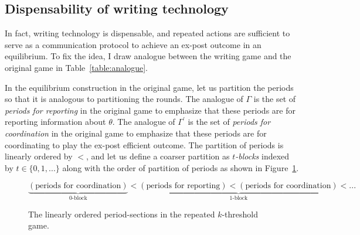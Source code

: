 \documentclass[12pt,letter]{article}
\theoremstyle{definition}
\theoremstyle{remark}
\theoremstyle{claim}
\begin{document}
\subsection{Dispensability of writing technology}
\label{sec:dis_writing}
In fact, writing technology is dispensable, and repeated actions are sufficient to serve as a communication protocol to achieve an ex-post outcome in an equilibrium. To fix the idea, I draw analogue between the writing game and the original game in Table~\ref{table:analogue}. 


In the equilibrium construction in the original game, let us partition the periods so that it is analogous to partitioning the rounds. The analogue of $\Gamma$ is the set of \textit{periods for reporting} in the original game to emphasize that these periods are for reporting information about $\theta$. The analogue of $\Gamma^{'}$ is the set of \textit{periods for coordination} in the original game to emphasize that these periods are for coordinating to play the ex-post efficient outcome. The partition of periods is linearly ordered by $<$, and let us define a coarser partition as \textit{$t$-blocks} indexed by $t\in\{0,1,...\}$ along with the order of partition of periods as shown in Figure~\ref{fig:ordered_original_game}.  

\begin{figure}
\[\underbrace{(\text{periods for coordination})}_{\text{$0$-block}}<\underbrace{(\text{periods for reporting})<(\text{periods for coordination})}_{\text{$1$-block}}<...\]
\caption{The linearly ordered period-sections in the repeated $k$-threshold game.}
\label{fig:ordered_original_game}
\end{figure}
\end{document}
